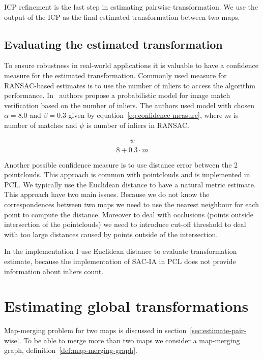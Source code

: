 \gls{ICP} refinement is the last step in estimating pairwise transformation. We use the output of the \gls{ICP} as the final estimated transformation between two maps.

\subsection{Evaluating the estimated transformation}
\label{sec:transform-evaluation}

To ensure robustness in real-world applications it is valuable to have a confidence measure for the estimated transformation. Commonly used measure for \gls{RANSAC}-based estimates is to use the number of inliers to access the algorithm performance. In~\citet{brown2007automatic} authors propose a probabilistic model for image match verification based on the number of inliers. The authors used model with chosen $\alpha = 8.0$ and $\beta = 0.3$ given by equation~\eqref{eq:confidence-measure}, where $m$ is number of matches and $\psi$ is number of inliers in \gls{RANSAC}.

\begin{equation}
\label{eq:confidence-measure}
\frac{\psi}{8 + 0.3 \cdot m}
\end{equation}

Another possible confidence measure is to use distance error between the $2$ pointclouds. This approach is common with pointclouds and is implemented in \gls{PCL}. We typically use the Euclidean distance to have a natural metric estimate. This approach have two main issues. Because we do not know the correspondences between two maps we need to use the nearest neighbour for each point to compute the distance. Moreover to deal with occlusions (points outside intersection of the pointclouds) we need to introduce cut-off threshold to deal with too large distances caused by points outside of the intersection.

In the implementation I use Euclidean distance to evaluate transformation estimate, because the implementation of \gls{SAC-IA} in \gls{PCL} does not provide information about inliers count.


\section{Estimating global transformations}
\label{sec:estimate-global}

Map-merging problem for two maps is discussed in section~\ref{sec:estimate-pair-wise}. To be able to merge more than two maps we consider a map-merging graph, definition~\ref{def:map-merging-graph}.

